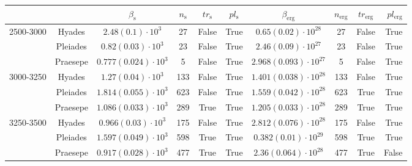 \begin{tabular}{lccccccccr}
\hline
          &         &                     $\beta_\mathrm{s}$ & $n_\mathrm{s}$ & $tr_\mathrm{s}$ & $pl_\mathrm{s}$ &                        $\beta_\mathrm{erg}$ & $n_\mathrm{erg}$ & $tr_\mathrm{erg}$ & $pl_\mathrm{erg}$ \\
\hline
2500-3000 & Hyades &     $2.48\left(0.1\right)\cdot 10^{3}$ &             27 &           False &            True &        $0.65\left(0.02\right)\cdot 10^{28}$ &               27 &             False &              True \\
          & Pleiades &    $0.82\left(0.03\right)\cdot 10^{3}$ &             23 &           False &            True &        $2.46\left(0.09\right)\cdot 10^{27}$ &               23 &             False &              True \\
          & Praesepe &  $0.777\left(0.024\right)\cdot 10^{3}$ &              5 &           False &            True &      $2.968\left(0.093\right)\cdot 10^{27}$ &                5 &             False &              True \\
3000-3250 & Hyades &    $1.27\left(0.04\right)\cdot 10^{3}$ &            133 &           False &            True &      $1.401\left(0.038\right)\cdot 10^{28}$ &              133 &             False &              True \\
          & Pleiades &  $1.814\left(0.055\right)\cdot 10^{3}$ &            623 &           False &            True &      $1.559\left(0.042\right)\cdot 10^{28}$ &              623 &              True &              True \\
          & Praesepe &  $1.086\left(0.033\right)\cdot 10^{3}$ &            289 &            True &            True &      $1.205\left(0.033\right)\cdot 10^{28}$ &              289 &              True &              True \\
3250-3500 & Hyades &   $0.966\left(0.03\right)\cdot 10^{3}$ &            175 &           False &            True &      $2.812\left(0.076\right)\cdot 10^{28}$ &              175 &             False &              True \\
          & Pleiades &  $1.597\left(0.049\right)\cdot 10^{3}$ &            598 &            True &            True &       $0.382\left(0.01\right)\cdot 10^{29}$ &              598 &              True &              True \\
          & Praesepe &  $0.917\left(0.028\right)\cdot 10^{3}$ &            477 &            True &            True &       $2.36\left(0.064\right)\cdot 10^{28}$ &              477 &              True &             False \\

\end{tabular}
